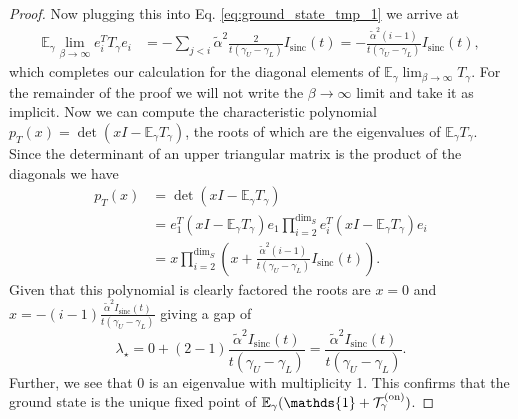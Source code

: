 \documentclass{article}
\newcommand{\on}{\rm on}
\newcommand{\EE}{\mathbb{E}}
\newcommand{\TT}{\mathcal{T}}
\newcommand{\identity}{\mathds{1}}
\DeclareMathOperator{\sinc}{sinc}
\begin{document}
\begin{proof}
Now plugging this into Eq. \ref{eq:ground_state_tmp_1} we arrive at
\begin{align}
    \EE_\gamma \lim_{\beta \to \infty} e_i^T T_\gamma e_i &= -   \sum_{j < i} \widetilde{\alpha}^2 \frac{2}{t(\gamma_U - \gamma_L)} I_{\sinc}(t) = - \frac{\widetilde{\alpha}^2 (i - 1)}{t(\gamma_U - \gamma_L)} I_{\sinc}(t),
\end{align}
which completes our calculation for the diagonal elements of $\EE_\gamma \lim_{\beta \to \infty} T_\gamma$. For the remainder of the proof we will not write the $\beta \to \infty$ limit and take it as implicit. Now we can compute the characteristic polynomial $p_T(x) = \det(x I - \EE_\gamma T_\gamma)$, the roots of which are the eigenvalues of $\EE_\gamma T_\gamma$. Since the determinant of an upper triangular matrix is the product of the diagonals we have
\begin{align}
    p_T(x) &= \det(x I - \EE_\gamma T_\gamma) \\
    &= e_1^T(x I - \EE_\gamma T_\gamma)e_1 \prod_{i = 2}^{\dim_S} e_i^T (x I - \EE_\gamma T_\gamma) e_i \\
    &= x \prod_{i = 2}^{\dim_S} \left( x + \frac{\widetilde{\alpha}^2 (i - 1)}{t(\gamma_U - \gamma_L)} I_{\sinc}(t)\right). \label{eq:ground_state_characteristic_poly}
\end{align}
Given that this polynomial is clearly factored the roots are $x = 0$ and $x = -(i - 1) \frac{\widetilde{\alpha}^2 I_{\sinc}(t)}{t(\gamma_U - \gamma_L)}$ giving a gap of 
\begin{equation}
    \lambda_\star = 0 + (2 -1) \frac{\widetilde{\alpha}^2 I_{\sinc}(t)}{t(\gamma_U - \gamma_L)} = \frac{\widetilde{\alpha}^2 I_{\sinc}(t)}{t(\gamma_U - \gamma_L)}. \label{eq:ground_state_spectral_gap}
\end{equation}
Further, we see that 0 is an eigenvalue with multiplicity 1. This confirms that the ground state is the unique fixed point of $\EE_\gamma (\identity + \TT_\gamma^{(\on)})$.


\end{proof}
\end{document}
